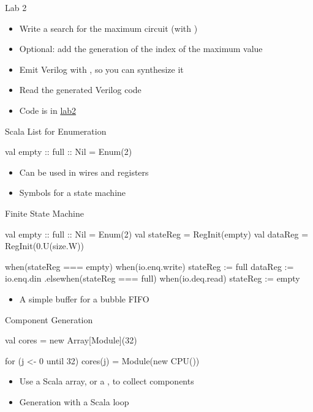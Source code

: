 \begin{frame}[fragile]{Lab 2}
\begin{itemize}
\item Write a search for the maximum circuit (with )
\item Optional: add the generation of the index of the maximum value
\item Emit Verilog with , so you can synthesize it
\item Read the generated Verilog code
\item Code is in \href{https://github.com/schoeberl/agile-hw/tree/main/lab2}{lab2}
\end{itemize}
\end{frame}




\begin{frame}[fragile]{Scala List for Enumeration}
\begin{chisel}
  val empty :: full :: Nil = Enum(2)
\end{chisel}
\begin{itemize}
\item Can be used in wires and registers
\item Symbols for a state machine
\end{itemize}
\end{frame}

\begin{frame}[fragile]{Finite State Machine}
\begin{chisel}
  val empty :: full :: Nil = Enum(2)
  val stateReg = RegInit(empty)
  val dataReg = RegInit(0.U(size.W))

  when(stateReg === empty) {
    when(io.enq.write) {
      stateReg := full
      dataReg := io.enq.din
    }
  }.elsewhen(stateReg === full) {
    when(io.deq.read) {
      stateReg := empty
    }
  }
\end{chisel}
\begin{itemize}
\item A simple buffer for a bubble FIFO
\end{itemize}
\end{frame}

\begin{frame}[fragile]{Component Generation}
\begin{chisel}
val cores = new Array[Module](32)

for (j <- 0 until 32)
  cores(j) = Module(new CPU())
\end{chisel}
\begin{itemize}
\item Use a Scala array, or a , to collect components
\item Generation with a Scala loop
\end{itemize}
\end{frame}

